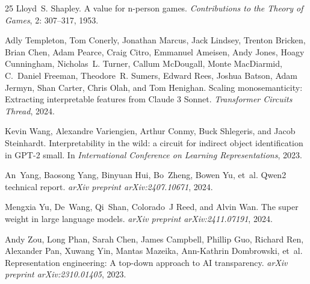 \documentclass[11pt]{article}
\begin{document}
\begin{thebibliography}{25}
Lloyd~S. Shapley.
\newblock A value for n-person games.
\newblock \emph{Contributions to the Theory of Games}, 2: 307--317,
  1953.

Adly Templeton, Tom Conerly, Jonathan Marcus, Jack Lindsey, Trenton Bricken,
  Brian Chen, Adam Pearce, Craig Citro, Emmanuel Ameisen, Andy Jones, Hoagy
  Cunningham, Nicholas~L. Turner, Callum McDougall, Monte MacDiarmid, C.~Daniel
  Freeman, Theodore~R. Sumers, Edward Rees, Joshua Batson, Adam Jermyn, Shan
  Carter, Chris Olah, and Tom Henighan.
\newblock Scaling monosemanticity: Extracting interpretable features from
  {Claude} 3 {Sonnet}.
\newblock \emph{Transformer Circuits Thread}, 2024.

Kevin Wang, Alexandre Variengien, Arthur Conmy, Buck Shlegeris, and Jacob
  Steinhardt.
\newblock Interpretability in the wild: a circuit for indirect object
  identification in {GPT}-2 small.
\newblock In \emph{International Conference on Learning Representations}, 2023.

An~Yang, Baosong Yang, Binyuan Hui, Bo~Zheng, Bowen Yu, et~al.
\newblock Qwen2 technical report.
\newblock \emph{arXiv preprint arXiv:2407.10671}, 2024.

Mengxia Yu, De~Wang, Qi~Shan, Colorado~J Reed, and Alvin Wan.
\newblock The super weight in large language models.
\newblock \emph{arXiv preprint arXiv:2411.07191}, 2024.

Andy Zou, Long Phan, Sarah Chen, James Campbell, Phillip Guo, Richard Ren,
  Alexander Pan, Xuwang Yin, Mantas Mazeika, Ann-Kathrin Dombrowski, et~al.
\newblock Representation engineering: A top-down approach to {AI} transparency.
\newblock \emph{arXiv preprint arXiv:2310.01405}, 2023.

\end{thebibliography}


\newpage

\appendix
\end{document}
